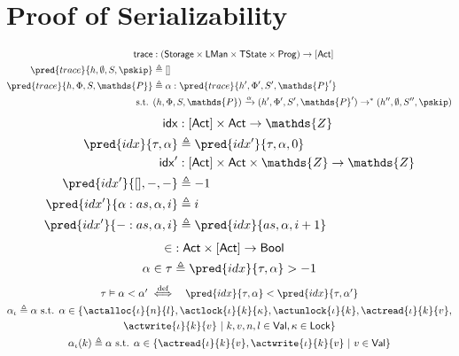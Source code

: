 \section{Proof of Serializability}

\begin{align*}
\mathsf{trace} &: (\mathsf{Storage} \times \mathsf{LMan} \times \mathsf{TState} \times \mathsf{Prog}) \rightarrow [\mathsf{Act}] \\
\pred{trace}{h, \emptyset, S, \pskip} &\triangleq [] \\
\pred{trace}{h, \Phi, S, \mathds{P}} &\triangleq \alpha : \pred{trace}{h', \Phi', S', \mathds{P}'}
\\
\text{s.t. }& (h, \Phi, S, \mathds{P}) \xrightarrow{\alpha} (h', \Phi', S', \mathds{P}') \rightarrow^* (h'', \emptyset, S'', \pskip)
\end{align*}
\begin{align*}
\mathsf{idx} &: [\mathsf{Act}] \times \mathsf{Act} \rightarrow \mathds{Z} \\
\pred{idx}{\tau, \alpha} &\triangleq \pred{idx'}{\tau, \alpha, 0} \\
\mathsf{idx}' &: [\mathsf{Act}] \times \mathsf{Act} \times \mathds{Z} \rightarrow \mathds{Z} \\
\pred{idx'}{[], -, -} &\triangleq -1 \\
\pred{idx'}{\alpha:as, \alpha, i} &\triangleq i \\
\pred{idx'}{-:as, \alpha, i} &\triangleq \pred{idx}{as, \alpha, i + 1}
\end{align*}
\begin{align*}
\in &: \mathsf{Act} \times [\mathsf{Act}] \rightarrow \mathsf{Bool} \\
\alpha \in \tau &\triangleq \pred{idx}{\tau, \alpha} > -1
\end{align*}
\begin{gather*}
\begin{array}{l l}
\tau \vDash \alpha < \alpha' \overset{\text{def}}{\iff}
&
\pred{idx}{\tau, \alpha} < \pred{idx}{\tau, \alpha'}
\end{array}
\\
\alpha_\iota \triangleq \alpha \text{ s.t. } \alpha \in \{ \actalloc{\iota}{n}{l}, \actlock{\iota}{k}{\kappa}, \actunlock{\iota}{k}, \actread{\iota}{k}{v}, \\ \actwrite{\iota}{k}{v}\ |\ k, v, n, l \in \mathsf{Val}, \kappa \in \mathsf{Lock} \}
\\
\alpha_\iota(k) \triangleq \alpha \text{ s.t. } \alpha \in \{ \actread{\iota}{k}{v}, \actwrite{\iota}{k}{v}\ |\ v \in \mathsf{Val} \}
\end{gather*}
